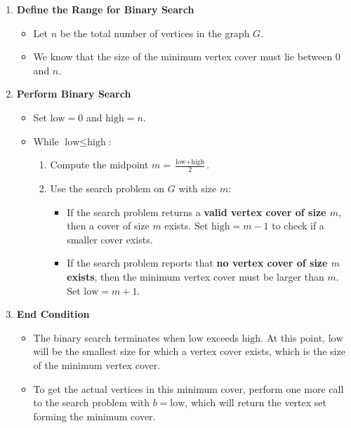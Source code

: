 \documentclass[11pt]{article}
\begin{document}
\begin{enumerate}
    \item \textbf{Define the Range for Binary Search}
    \begin{itemize}
        \item Let \( n \) be the total number of vertices in the graph \( G \).
        \item We know that the size of the minimum vertex cover must lie between \( 0 \) and \( n \).
    \end{itemize}

    \item \textbf{Perform Binary Search}
    \begin{itemize}
        \item Set \( \text{low} = 0 \) and \( \text{high} = n \).
        \item While \( \text{low} \leq \text{high} \):
        \begin{enumerate}
            \item Compute the midpoint \( m = \frac{\text{low} + \text{high}}{2} \).
            \item Use the search problem on \( G \) with size \( m \):
            \begin{itemize}
                \item If the search problem returns a \textbf{valid vertex cover of size \( m \)}, then a cover of size \( m \) exists. Set \( \text{high} = m - 1 \) to check if a smaller cover exists.
                \item If the search problem reports that \textbf{no vertex cover of size \( m \) exists}, then the minimum vertex cover must be larger than \( m \). Set \( \text{low} = m + 1 \).
            \end{itemize}
        \end{enumerate}
    \end{itemize}

    \item \textbf{End Condition}
    \begin{itemize}
        \item The binary search terminates when \( \text{low} \) exceeds \( \text{high} \). At this point, \( \text{low} \) will be the smallest size for which a vertex cover exists, which is the size of the minimum vertex cover.
        \item To get the actual vertices in this minimum cover, perform one more call to the search problem with \( b = \text{low} \), which will return the vertex set forming the minimum cover.
    \end{itemize}
\end{enumerate}
\end{document}
